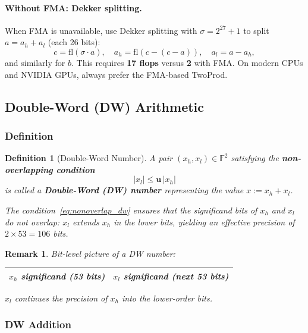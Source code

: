 \documentclass[12pt,a4paper]{article}
\newtheorem{definition}[theorem]{Definition}
\newtheorem{remark}[theorem]{Remark}
\newcommand{\fl}{\mathrm{fl}}
\newcommand{\uu}{\mathbf{u}}
\newcommand{\FF}{\mathbb{F}}
\begin{document}
\paragraph{Without FMA: Dekker splitting.}
When FMA is unavailable, use Dekker splitting with $\sigma = 2^{27} + 1$
to split $a = a_h + a_l$ (each 26 bits):
\[
  c = \fl(\sigma \cdot a), \quad
  a_h = \fl(c - (c - a)), \quad
  a_l = a - a_h,
\]
and similarly for $b$.
This requires \textbf{17 flops} versus \textbf{2} with FMA.
On modern CPUs and NVIDIA GPUs, always prefer the FMA-based TwoProd.

\subsection{Double-Word (DW) Arithmetic}
\label{sec:dw}

\subsubsection{Definition}

\begin{definition}[Double-Word Number]
A pair $(x_h, x_l) \in \FF^2$ satisfying the \textbf{non-overlapping condition}
\begin{equation}
  |x_l| \leq \uu\,|x_h|
  \label{eq:nonoverlap_dw}
\end{equation}
is called a \textbf{Double-Word (DW) number} representing the value
$x := x_h + x_l$.

The condition~\eqref{eq:nonoverlap_dw} ensures that the significand bits of
$x_h$ and $x_l$ do not overlap: $x_l$ extends $x_h$ in the lower bits,
yielding an effective precision of $2 \times 53 = 106$ bits.
\end{definition}

\begin{remark}
Bit-level picture of a DW number:
\begin{center}
\begin{tabular}{|c|c|}
\hline
$x_h$ significand (53 bits) & $x_l$ significand (next 53 bits) \\
\hline
\end{tabular}
\end{center}
$x_l$ continues the precision of $x_h$ into the lower-order bits.
\end{remark}

\subsubsection{DW Addition}
\end{document}
